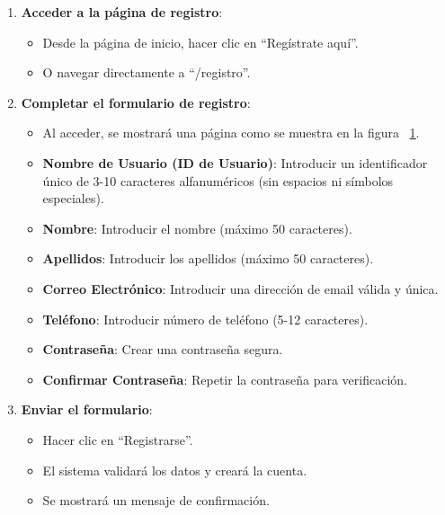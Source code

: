 \begin{enumerate}
   \item \textbf{Acceder a la página de registro}:

   \begin{itemize}
      \item Desde la página de inicio, hacer clic en ``Regístrate aquí''.
      \item O navegar directamente a ``/registro''.
   \end{itemize}
   \item \textbf{Completar el formulario de registro}:
   \begin{itemize}

      \begin{figure}[H]
         \centering
         \texttt{[image: reservapp\_registro]}
         \caption{Página para el registro de usuario.}
         \label{fig:reservapp_registro}
      \end{figure}

      \item Al acceder, se mostrará una página como se muestra en la figura ~\ref{fig:reservapp_registro}.
      \item \textbf{Nombre de Usuario (ID de Usuario)}: Introducir un identificador único de 3-10 caracteres alfanuméricos (sin espacios ni símbolos especiales).
      \item \textbf{Nombre}: Introducir el nombre (máximo 50 caracteres).
      \item \textbf{Apellidos}: Introducir los apellidos (máximo 50 caracteres).
      \item \textbf{Correo Electrónico}: Introducir una dirección de email válida y única.
      \item \textbf{Teléfono}: Introducir número de teléfono (5-12 caracteres).
      \item \textbf{Contraseña}: Crear una contraseña segura.
      \item \textbf{Confirmar Contraseña}: Repetir la contraseña para verificación.
   \end{itemize}
   \item \textbf{Enviar el formulario}:
   \begin{itemize}
      \item Hacer clic en ``Registrarse''.
      \item El sistema validará los datos y creará la cuenta.
      \item Se mostrará un mensaje de confirmación.
   \end{itemize}
\end{enumerate}

